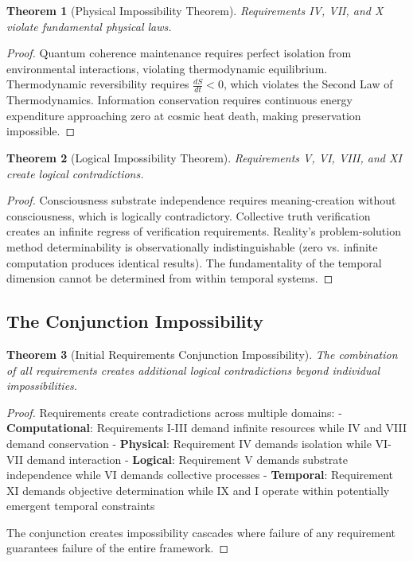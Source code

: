 \documentclass[12pt,a4paper]{article}
\newtheorem{theorem}{Theorem}[section]
\begin{document}
\begin{theorem}[Physical Impossibility Theorem]
Requirements IV, VII, and X violate fundamental physical laws.
\end{theorem}

\begin{proof}
Quantum coherence maintenance requires perfect isolation from environmental interactions, violating thermodynamic equilibrium. Thermodynamic reversibility requires $\frac{dS}{dt} < 0$, which violates the Second Law of Thermodynamics. Information conservation requires continuous energy expenditure approaching zero at cosmic heat death, making preservation impossible.
\end{proof}

\begin{theorem}[Logical Impossibility Theorem]
Requirements V, VI, VIII, and XI create logical contradictions.
\end{theorem}

\begin{proof}
Consciousness substrate independence requires meaning-creation without consciousness, which is logically contradictory. Collective truth verification creates an infinite regress of verification requirements. Reality's problem-solution method determinability is observationally indistinguishable (zero vs. infinite computation produces identical results). The fundamentality of the temporal dimension cannot be determined from within temporal systems.
\end{proof}

\subsection{The Conjunction Impossibility}

\begin{theorem}[Initial Requirements Conjunction Impossibility]
The combination of all requirements creates additional logical contradictions beyond individual impossibilities.
\end{theorem}

\begin{proof}
Requirements create contradictions across multiple domains:
- \textbf{Computational}: Requirements I-III demand infinite resources while IV and VIII demand conservation
- \textbf{Physical}: Requirement IV demands isolation while VI-VII demand interaction  
- \textbf{Logical}: Requirement V demands substrate independence while VI demands collective processes
- \textbf{Temporal}: Requirement XI demands objective determination while IX and I operate within potentially emergent temporal constraints

The conjunction creates impossibility cascades where failure of any requirement guarantees failure of the entire framework.
\end{proof}
\end{document}
